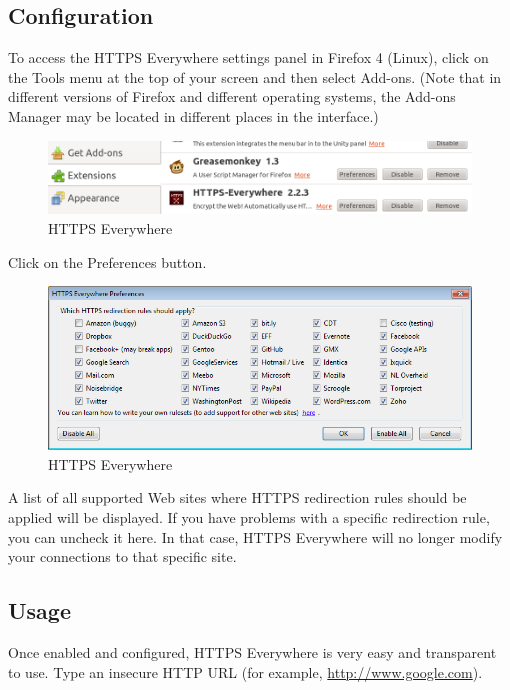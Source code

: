 \subsection{Configuration}

To access the HTTPS Everywhere settings panel in Firefox 4 (Linux),
click on the Tools menu at the top of your screen and then select
Add-ons. (Note that in different versions of Firefox and different
operating systems, the Add-ons Manager may be located in different
places in the interface.)

\begin{figure}[htbp]
\centering
\includegraphics{https_everywhere_3.png}
\caption{HTTPS Everywhere}
\end{figure}

Click on the Preferences button.

\begin{figure}[htbp]
\centering
\includegraphics{https_everywhere_4.png}
\caption{HTTPS Everywhere}
\end{figure}

A list of all supported Web sites where HTTPS redirection rules should
be applied will be displayed. If you have problems with a specific
redirection rule, you can uncheck it here. In that case, HTTPS
Everywhere will no longer modify your connections to that specific site.

\subsection{Usage}

Once enabled and configured, HTTPS Everywhere is very easy and
transparent to use. Type an insecure HTTP URL (for example,
\href{http://www.google.com}{http://www.google.com}).

